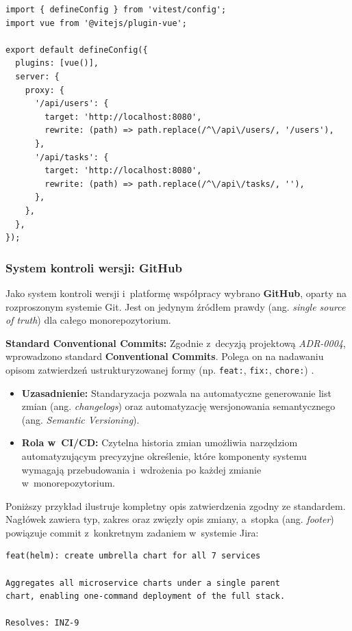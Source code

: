 \begin{lstlisting}[caption={Fragment konfiguracji Vite z~proxy dla środowiska deweloperskiego (apps/frontend/vite.config.ts)}, label={lst:vite-config}]
import { defineConfig } from 'vitest/config';
import vue from '@vitejs/plugin-vue';

export default defineConfig({
  plugins: [vue()],
  server: {
    proxy: {
      '/api/users': {
        target: 'http://localhost:8080',
        rewrite: (path) => path.replace(/^\/api\/users/, '/users'),
      },
      '/api/tasks': {
        target: 'http://localhost:8080',
        rewrite: (path) => path.replace(/^\/api\/tasks/, ''),
      },
    },
  },
});
\end{lstlisting}


\subsubsection{System kontroli wersji: GitHub}
Jako system kontroli wersji i~platformę współpracy wybrano \textbf{GitHub}, oparty na rozproszonym systemie Git. Jest on jedynym źródłem prawdy (ang. \textit{single source of truth}) dla całego monorepozytorium.

\textbf{Standard Conventional Commits:}
Zgodnie z~decyzją projektową \textit{ADR-0004}, wprowadzono standard \textbf{Conventional Commits}. Polega on na nadawaniu opisom zatwierdzeń ustrukturyzowanej formy (np. \texttt{feat:}, \texttt{fix:}, \texttt{chore:}) \cite{conventionalCommits}.
\begin{itemize}
    \item \textbf{Uzasadnienie:} Standaryzacja pozwala na automatyczne generowanie list zmian (ang. \textit{changelogs}) oraz automatyzację wersjonowania semantycznego (ang. \textit{Semantic Versioning}).
    \item \textbf{Rola w~CI/CD:} Czytelna historia zmian umożliwia narzędziom automatyzującym precyzyjne określenie, które komponenty systemu wymagają przebudowania i~wdrożenia po każdej zmianie w~monorepozytorium.
\end{itemize}

Poniższy przykład ilustruje kompletny opis zatwierdzenia zgodny ze standardem. Nagłówek zawiera typ, zakres oraz zwięzły opis zmiany, a~stopka (ang. \textit{footer}) powiązuje commit z~konkretnym zadaniem w~systemie Jira:

\begin{lstlisting}[caption={Przykład opisu zatwierdzenia zgodnego ze standardem Conventional Commits}, label={lst:conventional-commit}]
feat(helm): create umbrella chart for all 7 services

Aggregates all microservice charts under a single parent
chart, enabling one-command deployment of the full stack.

Resolves: INZ-9
\end{lstlisting}

